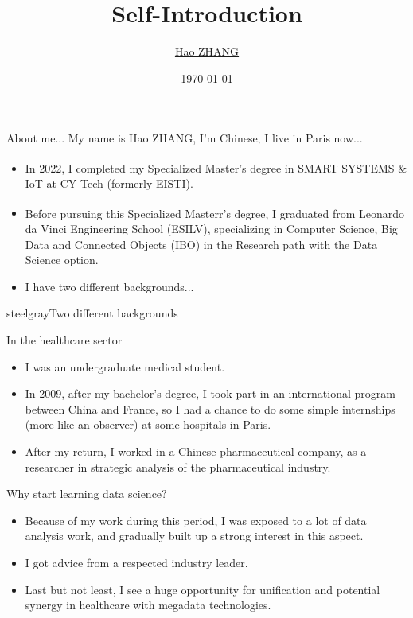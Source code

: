 \documentclass{beamer}
\title{Self-Introduction}
\author{\href{mailto:haozhang@me.com}{Hao ZHANG}}
\date{\today}
\begin{document}
	\maketitle
	
	
	\begin{frame}{About me...}
		My name is Hao ZHANG, I'm Chinese, I live in Paris now...
		\begin{itemize}
			\item In 2022, I completed my Specialized Master\textsuperscript{\textregistered}'s degree in SMART SYSTEMS \& IoT at CY Tech (formerly EISTI).
			\item Before pursuing this Specialized Masterr\textsuperscript{\textregistered}'s degree, I graduated from Leonardo da Vinci Engineering School (ESILV), specializing in Computer Science, Big Data and Connected Objects (IBO) in the Research path with the Data Science option.
			\item I have two different backgrounds...
		\end{itemize}
	\end{frame}
	
	\begin{chapter}{steelgray}{Two different backgrounds}
	\end{chapter}
	
	\begin{frame}[fragile]{In the healthcare sector}
		\begin{itemize}[<+->]
			\item I was an undergraduate medical student.
			\item In 2009, after my bachelor's degree, I took part in an international program between China and France, so I had a chance to do some simple internships (more like an observer) at some hospitals in Paris.
			\item After my return, I worked in a Chinese pharmaceutical company, as a researcher in strategic analysis of the pharmaceutical industry.
		\end{itemize}
	\end{frame}
	
	\begin{frame}[fragile]{Why start learning data science?}
		\begin{itemize}[<+->]
			\item Because of my work during this period, I was exposed to a lot of data analysis work, and gradually built up a strong interest in this aspect.
			\item  I got advice from a respected industry leader.
			\item Last but not least, I see a huge opportunity for unification and potential synergy in healthcare with megadata technologies.
		\end{itemize}
	\end{frame}
	
\end{document}
